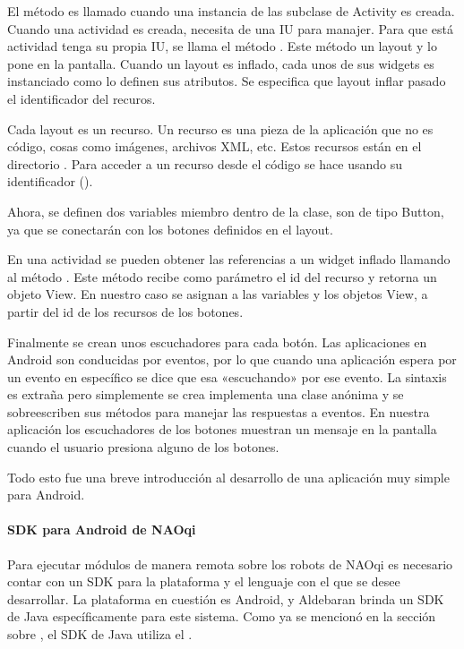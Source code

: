 El método  es llamado cuando una instancia de las subclase
de Activity es creada. Cuando una actividad es creada, necesita de una IU para
manajer. Para que está actividad tenga su propia IU, se llama el método
. Este método  un layout y lo pone en la pantalla.
Cuando un layout es inflado, cada unos de sus widgets es instanciado como
lo definen sus atributos. Se especifica que layout inflar pasado el identificador
del recuros.

Cada layout es un recurso. Un recurso es una pieza de la aplicación que no es
código, cosas como imágenes, archivos XML, etc. Estos recursos están en
el directorio . Para acceder a un recurso desde el código se hace
usando su identificador ().

Ahora, se definen dos variables miembro dentro de la clase, son de tipo
Button, ya que se conectarán con los botones definidos en el layout.

En una actividad se pueden obtener las referencias a un widget inflado llamando
al método . Este método recibe como parámetro el id del recurso
y retorna un objeto View. En nuestro caso se asignan a las variables
 y  los objetos View, a partir del id
de los recursos de los botones.

Finalmente se crean unos escuchadores para cada botón. Las aplicaciones en
Android son conducidas por eventos, por lo que cuando una aplicación espera
por un evento en específico se dice que esa «escuchando» por ese evento. La
sintaxis es extraña pero simplemente se crea implementa una clase anónima
y se sobreescriben sus métodos para manejar las respuestas a eventos. En nuestra
aplicación los escuchadores de los botones muestran un mensaje en la pantalla
cuando el usuario presiona alguno de los botones.

Todo esto fue una breve introducción al desarrollo de una aplicación muy simple
para Android.


\paragraph{SDK para Android de NAOqi}
\label{\detokenize{dev_docs:sdk-para-android-de-naoqi}}
Para ejecutar módulos de manera remota sobre los robots de NAOqi es necesario
contar con un SDK para la plataforma y el lenguaje con el que se desee
desarrollar. La plataforma en cuestión es Android, y Aldebaran brinda un SDK
de Java específicamente para este sistema. Como ya se mencionó en la sección
sobre , el SDK de Java utiliza el .

